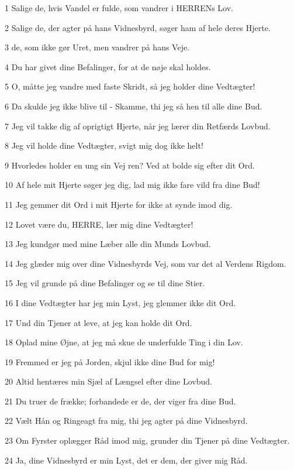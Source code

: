 \par 1 Salige de, hvis Vandel er fulde, som vandrer i HERRENs Lov.
\par 2 Salige de, der agter på hans Vidnesbyrd, søger ham af hele deres Hjerte.
\par 3 de, som ikke gør Uret, men vandrer på hans Veje.
\par 4 Du har givet dine Befalinger, for at de nøje skal holdes.
\par 5 O, måtte jeg vandre med faste Skridt, så jeg holder dine Vedtægter!
\par 6 Da skulde jeg ikke blive til - Skamme, thi jeg så hen til alle dine Bud.
\par 7 Jeg vil takke dig af oprigtigt Hjerte, når jeg lærer din Retfærds Lovbud.
\par 8 Jeg vil holde dine Vedtægter, svigt mig dog ikke helt!
\par 9 Hvorledes holder en ung sin Vej ren? Ved at bolde sig efter dit Ord.
\par 10 Af hele mit Hjerte søger jeg dig, lad mig ikke fare vild fra dine Bud!
\par 11 Jeg gemmer dit Ord i mit Hjerte for ikke at synde imod dig.
\par 12 Lovet være du, HERRE, lær mig dine Vedtægter!
\par 13 Jeg kundgør med mine Læber alle din Munds Lovbud.
\par 14 Jeg glæder mig over dine Vidnesbyrds Vej, som var det al Verdens Rigdom.
\par 15 Jeg vil grunde på dine Befalinger og se til dine Stier.
\par 16 I dine Vedtægter har jeg min Lyst, jeg glemmer ikke dit Ord.
\par 17 Und din Tjener at leve, at jeg kan holde dit Ord.
\par 18 Oplad mine Øjne, at jeg må skue de underfulde Ting i din Lov.
\par 19 Fremmed er jeg på Jorden, skjul ikke dine Bud for mig!
\par 20 Altid hentæres min Sjæl af Længsel efter dine Lovbud.
\par 21 Du truer de frække; forbandede er de, der viger fra dine Bud.
\par 22 Vælt Hån og Ringeagt fra mig, thi jeg agter på dine Vidnesbyrd.
\par 23 Om Fyrster oplægger Råd imod mig, grunder din Tjener på dine Vedtægter.
\par 24 Ja, dine Vidnesbyrd er min Lyst, det er dem, der giver mig Råd.
